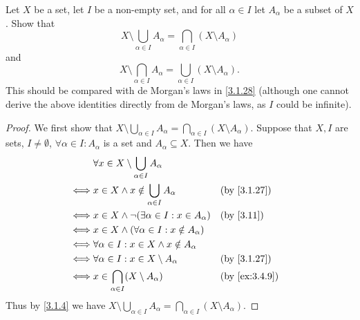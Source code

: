 \begin{ex}\label{ex:3.4.11}
  Let \(X\) be a set, let \(I\) be a non-empty set, and for all \(\alpha \in I\) let \(A_{\alpha}\) be a subset of \(X\).
  Show that
  \[
    X \setminus \bigcup_{\alpha \in I} A_{\alpha} = \bigcap_{\alpha \in I} (X \setminus A_{\alpha})
  \]
  and
  \[
    X \setminus \bigcap_{\alpha \in I} A_{\alpha} = \bigcup_{\alpha \in I} (X \setminus A_{\alpha}).
  \]
  This should be compared with de Morgan's laws in \cref{3.1.28}
  (although one cannot derive the above identities directly from de Morgan's laws, as \(I\) could be infinite).
\end{ex}

\begin{proof}
  We first show that \(X \setminus \bigcup_{\alpha \in I} A_{\alpha} = \bigcap_{\alpha \in I} (X \setminus A_{\alpha})\).
  Suppose that \(X, I\) are sets, \(I \neq \emptyset\), \(\forall \alpha \in I : A_{\alpha}\) is a set and \(A_{\alpha} \subseteq X\).
  Then we have
  \begin{align*}
         & \forall x \in X \setminus \bigcup_{\alpha \in I} A_{\alpha}                               \\
    \iff & x \in X \land x \notin \bigcup_{\alpha \in I} A_{\alpha}     &  & \by{3.1.27}             \\
    \iff & x \in X \land \lnot(\exists \alpha \in I : x \in A_{\alpha}) &  & \text{(by \cref{3.11})} \\
    \iff & x \in X \land (\forall \alpha \in I : x \notin A_{\alpha})                                \\
    \iff & \forall \alpha \in I : x \in X \land x \notin A_{\alpha}                                  \\
    \iff & \forall \alpha \in I : x \in X \setminus A_{\alpha}          &  & \by{3.1.27}             \\
    \iff & x \in \bigcap_{\alpha \in I} (X \setminus A_{\alpha})        &  & \by{ex:3.4.9}           \\
  \end{align*}
  Thus by \cref{3.1.4} we have \(X \setminus \bigcup_{\alpha \in I} A_{\alpha} = \bigcap_{\alpha \in I} (X \setminus A_{\alpha})\).


\end{proof}
